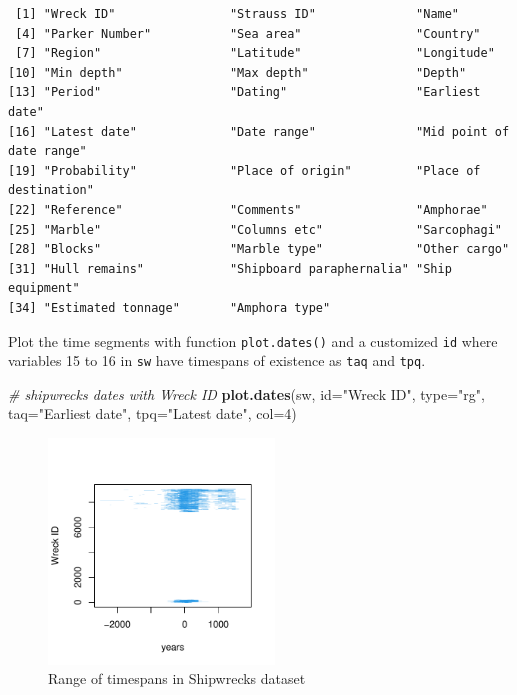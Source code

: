 \documentclass[a4paper,11pt]{memoir}
\newenvironment{Shaded}{\begin{snugshade}}{\end{snugshade}}
\newcommand{\CommentTok}[1]{\textcolor[rgb]{0.56,0.35,0.01}{\textit{#1}}}
\newcommand{\DataTypeTok}[1]{\textcolor[rgb]{0.13,0.29,0.53}{#1}}
\newcommand{\DecValTok}[1]{\textcolor[rgb]{0.00,0.00,0.81}{#1}}
\newcommand{\KeywordTok}[1]{\textcolor[rgb]{0.13,0.29,0.53}{\textbf{#1}}}
\newcommand{\NormalTok}[1]{#1}
\newcommand{\StringTok}[1]{\textcolor[rgb]{0.31,0.60,0.02}{#1}}
\begin{document}
\begin{verbatim}
 [1] "Wreck ID"                "Strauss ID"              "Name"                   
 [4] "Parker Number"           "Sea area"                "Country"                
 [7] "Region"                  "Latitude"                "Longitude"              
[10] "Min depth"               "Max depth"               "Depth"                  
[13] "Period"                  "Dating"                  "Earliest date"          
[16] "Latest date"             "Date range"              "Mid point of date range"
[19] "Probability"             "Place of origin"         "Place of destination"   
[22] "Reference"               "Comments"                "Amphorae"               
[25] "Marble"                  "Columns etc"             "Sarcophagi"             
[28] "Blocks"                  "Marble type"             "Other cargo"            
[31] "Hull remains"            "Shipboard paraphernalia" "Ship equipment"         
[34] "Estimated tonnage"       "Amphora type"           
\end{verbatim}

Plot the time segments with function \texttt{plot.dates()} and a
customized \texttt{\textquotesingle{}id\textquotesingle{}} where
variables 15 to 16 in \texttt{sw} have timespans of existence as
\texttt{\textquotesingle{}taq\textquotesingle{}} and
\texttt{\textquotesingle{}tpq\textquotesingle{}}.

\begin{Shaded}
\begin{Highlighting}[]
\CommentTok{# shipwrecks dates with Wreck ID}
\KeywordTok{plot.dates}\NormalTok{(sw, }\DataTypeTok{id=}\StringTok{"Wreck ID"}\NormalTok{, }\DataTypeTok{type=}\StringTok{"rg"}\NormalTok{, }\DataTypeTok{taq=}\StringTok{"Earliest date"}\NormalTok{, }\DataTypeTok{tpq=}\StringTok{"Latest date"}\NormalTok{, }\DataTypeTok{col=}\DecValTok{4}\NormalTok{)}
\end{Highlighting}
\end{Shaded}

\begin{figure}

\centering
\includegraphics[width=6cm, trim=0 0 0 40, clip]{img/unnamed-chunk-5-1} %

\caption{Range of timespans in Shipwrecks dataset}\label{fig:unnamed-chunk-5}
\end{figure}
\end{document}
